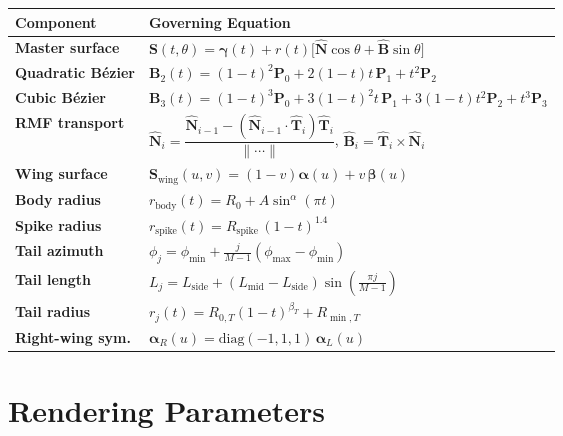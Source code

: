 \documentclass[12pt,a4paper]{article}
\newcommand{\vv}[1]{\bm{#1}}          %
\newcommand{\T}{\hat{\bm{T}}}         %
\newcommand{\N}{\hat{\bm{N}}}         %
\newcommand{\B}{\hat{\bm{B}}}         %
\begin{document}
\begin{center}
\renewcommand{\arraystretch}{1.6}
\begin{tabular}{>{\bfseries}l l}
  \toprule
  Component       & Governing Equation \\
  \midrule
  Master surface  &
    $\vv{S}(t,\theta) = \vv{\gamma}(t) + r(t)\bigl[\N\cos\theta + \B\sin\theta\bigr]$ \\
  Quadratic Bézier &
    $\vv{B}_2(t) = (1-t)^2\vv{P}_0 + 2(1-t)t\,\vv{P}_1 + t^2\vv{P}_2$ \\
  Cubic Bézier    &
    $\vv{B}_3(t) = (1-t)^3\vv{P}_0 + 3(1-t)^2t\,\vv{P}_1 + 3(1-t)t^2\vv{P}_2 + t^3\vv{P}_3$ \\
  RMF transport   &
    $\N_i = \dfrac{\N_{i-1} - (\N_{i-1}\cdot\T_i)\T_i}{\lVert\cdots\rVert}$,\;
    $\B_i = \T_i\times\N_i$ \\
  Wing surface    &
    $\vv{S}_{\mathrm{wing}}(u,v) = (1-v)\vv{\alpha}(u) + v\,\vv{\beta}(u)$ \\
  Body radius     &
    $r_{\mathrm{body}}(t) = R_0 + A\sin^{\alpha}(\pi t)$ \\
  Spike radius    &
    $r_{\mathrm{spike}}(t) = R_{\mathrm{spike}}\,(1-t)^{1.4}$ \\
  Tail azimuth    &
    $\phi_j = \phi_{\min} + \tfrac{j}{M-1}(\phi_{\max}-\phi_{\min})$ \\
  Tail length     &
    $L_j = L_{\mathrm{side}} + (L_{\mathrm{mid}}-L_{\mathrm{side}})\sin\!\left(\tfrac{\pi j}{M-1}\right)$ \\
  Tail radius     &
    $r_j(t) = R_{0,T}(1-t)^{\beta_T} + R_{\min,T}$ \\
  Right-wing sym. &
    $\vv{\alpha}_R(u) = \mathrm{diag}(-1,1,1)\,\vv{\alpha}_L(u)$ \\
  \bottomrule
\end{tabular}
\end{center}

\section{Rendering Parameters}
\end{document}
